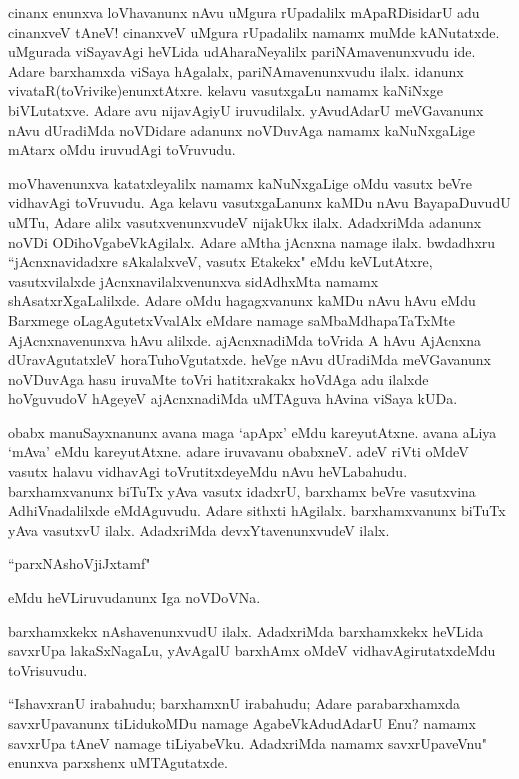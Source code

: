 cinanx enunxva loVhavanunx nAvu uMgura rUpadalilx mApaRDisidarU adu cinanxveV tAneV! cinanxveV uMgura rUpadalilx namamx muMde kANutatxde. uMgurada viSayavAgi heVLida udAharaNeyalilx pariNAmavenunxvudu ide. Adare barxhamxda viSaya hAgalalx, pariNAmavenunxvudu ilalx. idanunx vivataR(toVrivike)enunxtAtxre. kelavu vasutxgaLu namamx kaNiNxge biVLutatxve. Adare avu nijavAgiyU iruvudilalx. yAvudAdarU meVGavanunx nAvu dUradiMda noVDidare adanunx noVDuvAga namamx kaNuNxgaLige mAtarx oMdu iruvudAgi toVruvudu.

moVhavenunxva katatxleyalilx namamx kaNuNxgaLige oMdu vasutx beVre vidhavAgi toVruvudu. Aga kelavu vasutxgaLanunx kaMDu nAvu BayapaDuvudU uMTu, Adare alilx vasutxvenunxvudeV nijakUkx ilalx. AdadxriMda adanunx noVDi ODihoVgabeVkAgilalx. Adare aMtha jAcnxna namage ilalx. bwdadhxru ``jAcnxnavidadxre sAkalalxveV, vasutx Etakekx" eMdu keVLutAtxre, vasutxvilalxde jAcnxnavilalxvenunxva sidAdhxMta namamx shAsatxrXgaLalilxde. Adare oMdu hagagxvanunx kaMDu nAvu hAvu eMdu Barxmege oLagAgutetxVvalAlx eMdare namage saMbaMdhapaTaTxMte AjAcnxnavenunxva hAvu alilxde. ajAcnxnadiMda toVrida A hAvu AjAcnxna dUravAgutatxleV horaTuhoVgutatxde. heVge nAvu dUradiMda meVGavanunx noVDuvAga hasu iruvaMte toVri hatitxrakakx hoVdAga adu ilalxde hoVguvudoV hAgeyeV ajAcnxnadiMda uMTAguva hAvina viSaya kUDa. 


obabx manuSayxnanunx avana maga `apApx' eMdu kareyutAtxne. avana aLiya `mAva' eMdu kareyutAtxne. adare iruvavanu obabxneV. adeV riVti oMdeV vasutx halavu vidhavAgi toVrutitxdeyeMdu nAvu heVLabahudu. barxhamxvanunx biTuTx yAva vasutx idadxrU, barxhamx beVre vasutxvina AdhiVnadalilxde eMdAguvudu. Adare sithxti hAgilalx. barxhamxvanunx biTuTx yAva vasutxvU ilalx. AdadxriMda devxYtavenunxvudeV ilalx. 

\begin{shloka}
``parxNAshoVjiJxtamf"
\end{shloka}

\noindent eMdu heVLiruvudanunx Iga noVDoVNa.

barxhamxkekx nAshavenunxvudU ilalx. AdadxriMda barxhamxkekx heVLida savxrUpa lakaSxNagaLu, yAvAgalU barxhAmx oMdeV vidhavAgirutatxdeMdu toVrisuvudu. 

``IshavxranU irabahudu; barxhamxnU irabahudu; Adare parabarxhamxda savxrUpavanunx tiLidukoMDu namage AgabeVkAdudAdarU Enu? namamx savxrUpa tAneV namage tiLiyabeVku. AdadxriMda namamx savxrUpaveVnu" enunxva parxshenx uMTAgutatxde. 

